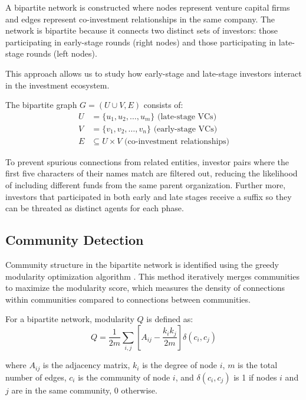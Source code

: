 A bipartite network is constructed where nodes represent venture capital firms and edges represent co-investment relationships in the same company. The network is bipartite because it connects two distinct sets of investors: those participating in early-stage rounds (right nodes) and those participating in late-stage rounds (left nodes).

This approach allows us to study how early-stage and late-stage investors interact in the investment ecosystem.

The bipartite graph $G = (U \cup V, E)$ consists of:
\begin{align}
U &= \{u_1, u_2, \ldots, u_m\} \text{ (late-stage VCs)} \\
V &= \{v_1, v_2, \ldots, v_n\} \text{ (early-stage VCs)} \\
E &\subseteq U \times V \text{ (co-investment relationships)}
\end{align}

To prevent spurious connections from related entities, investor pairs where the first five characters of their names match are filtered out, reducing the likelihood of including different funds from the same parent organization. Further more,  investors that participated in both early and late stages receive a suffix so they can be threated as distinct agents for each phase.



\subsection{Community Detection}

Community structure in the bipartite network is identified using the greedy modularity optimization algorithm \cite{Borgatti2011}. This method iteratively merges communities to maximize the modularity score, which measures the density of connections within communities compared to connections between communities.

For a bipartite network, modularity $Q$ is defined as:
\begin{equation}
Q = \frac{1}{2m} \sum_{i,j} \left[ A_{ij} - \frac{k_i k_j}{2m} \right] \delta(c_i, c_j)
\end{equation}

where $A_{ij}$ is the adjacency matrix, $k_i$ is the degree of node $i$, $m$ is the total number of edges, $c_i$ is the community of node $i$, and $\delta(c_i, c_j)$ is 1 if nodes $i$ and $j$ are in the same community, 0 otherwise.

